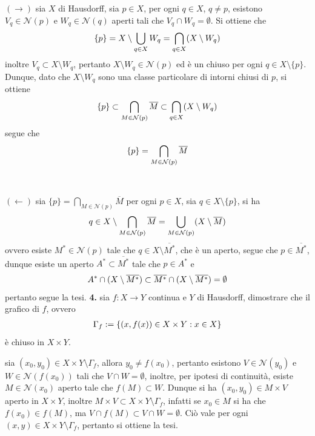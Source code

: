 \documentclass[oneside, 11pt]{amsbook}
\makeatletter
\newcommand{\0}{{(0)}}
\newcommand{\3}{{(3)}}
\theoremstyle{colonplain}
\theoremstyle{colondefinition}
\theoremstyle{colonremark}
\numberwithin{equation}{chapter}
\renewcommand{\proofname}{Dimostrazione}
\renewenvironment{proof}[1][\proofname]{\par
  \pushQED{\qed}%
  \normalfont \topsep6\p@\@plus6\p@\relax
  \trivlist
  \item[\hskip\labelsep\bfseries #1:]\ignorespaces
}{%
  \popQED\endtrivlist\@endpefalse
}
\makeatother
\begin{document}
\begin{proof}
$(\rightarrow)$ sia $X$ di Hausdorff, sia $p \in X$, per ogni $q \in X$, $q \neq p$, esistono $V_q \in \mathcal{N}(p)$ e $W_q \in \mathcal{N}(q)$ aperti tali che $V_q \cap W_q = \emptyset$. Si ottiene che
\begin{align}
    \{ p \} = X \setminus \bigcup_{q \in X} W_q = \bigcap_{q \in X} (X \setminus W_q) \notag
\end{align}
inoltre $V_q \subset X \setminus W_q$, pertanto $X \setminus W_q \in \mathcal{N}(p)$ ed è un chiuso per ogni $q \in X \setminus \{ p \}$. Dunque, dato che $X \setminus W_q$ sono una classe particolare di intorni chiusi di $p$, si ottiene
\begin{align}
    \{ p \} \subset \bigcap_{M \in \mathcal{N}(p)} \overline{M} \subset \bigcap_{q \in X} (X \setminus W_q) \notag
\end{align}
segue che
\begin{align}
    \{ p \} = \bigcap_{M \in \mathcal{N}(p)} \overline{M} \notag
\end{align} \\ \\
$(\leftarrow)$ sia $\{ p \} = \bigcap_{M \in \mathcal{N}(p)} \overline{M}$ per ogni $p \in X$, sia $q \in X \setminus \{ p \}$, si ha
\begin{align}
    q \in X \setminus \bigcap_{M \in \mathcal{N}(p)} \overline{M} = \bigcup_{M \in \mathcal{N}(p)} (X \setminus \overline{M}) \notag
\end{align}
ovvero esiste $M^* \in \mathcal{N}(p)$ tale che $q \in X \setminus \overline{M^*}$, che è un aperto, segue che $p \in \overline{M^*}$, dunque esiste un aperto $A^* \subset \overline{M^*}$ tale che $p \in A^*$ e
\begin{align}
    A^* \cap (X \setminus \overline{M^*}) \subset \overline{M^*} \cap (X \setminus \overline{M^*}) = \emptyset \notag
\end{align}
pertanto segue la tesi.
\end{proof}
\textbf{4.} sia $f : X \longrightarrow Y$ continua e $Y$ di Hausdorff, dimostrare che il grafico di $f$, ovvero
\begin{align}
    \Gamma_f := \{ (x, f(x)) \in X \times Y : x \in X \} \notag
\end{align}
è chiuso in $X \times Y$.
\begin{proof}
sia $(x_0, y_0) \in X \times Y \setminus \Gamma_f$, allora $y_0 \neq f(x_0)$, pertanto esistono $V \in \mathcal{N}(y_0)$ e $W \in \mathcal{N}(f(x_0))$ tali che $V \cap W = \emptyset$, inoltre, per ipotesi di continuità, esiste $M \in \mathcal{N}(x_0)$ aperto tale che $f(M) \subset W$. Dunque si ha $(x_0, y_0) \in M \times V$ aperto in $X \times Y$, inoltre $M \times V \subset X \times Y \setminus \Gamma_f$, infatti se $x_0 \in M$ si ha che $f(x_0) \in f(M)$, ma $V \cap f(M) \subset V \cap W = \emptyset$. Ciò vale per ogni $(x, y) \in X \times Y \setminus \Gamma_f$, pertanto si ottiene la tesi.
\end{proof}
\end{document}
